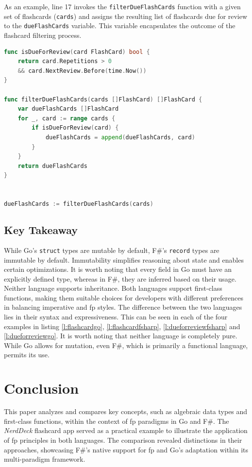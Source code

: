     As an example, line 17 invokes the \texttt{filterDueFlashCards} function with a given set of flashcards (\texttt{cards}) and assigns the resulting list of flashcards due for review to the \texttt{dueFlashCards} variable. This variable encapsulates the outcome of the flashcard filtering process.

\begin{lstlisting}[language=go, firstnumber=1, caption={FlashCard representation in F\#}, label=l:dueforreviewgo]
func isDueForReview(card FlashCard) bool {
    return card.Repetitions > 0 
    && card.NextReview.Before(time.Now())
}

func filterDueFlashCards(cards []FlashCard) []FlashCard {
    var dueFlashCards []FlashCard
    for _, card := range cards {
        if isDueForReview(card) {
            dueFlashCards = append(dueFlashCards, card)
        }
    }
    return dueFlashCards
}


dueFlashCards := filterDueFlashCards(cards)
\end{lstlisting}
            

    \section{Key Takeaway}\label{sec:keytakeaway}
    While Go's \texttt{struct} types are mutable by default, F\#'s \texttt{record} types are immutable by default. Immutability simplifies reasoning about state and enables certain optimizations. It is worth noting that every field in Go must have an explicitly defined type, whereas in F\#, they are inferred based on their usage. Neither language supports inheritance. Both languages support first-class functions, making them suitable choices for developers with different preferences in balancing imperative and \ac{fp} styles. The difference between the two languages lies in their syntax and expressiveness. This can be seen in each of the four examples in listing \ref{l:flashcardgo}, \ref{l:flashcardfsharp}, \ref{l:dueforreviewfsharp} and \ref{l:dueforreviewgo}. It is worth noting that neither language is completely pure. While Go allows for mutation, even F\#, which is primarily a functional language, permits its use.



\chapter{Conclusion}\label{chap:conclusion}
This paper analyzes and compares key concepts, such as algebraic data types and first-class functions, within the context of \ac{fp} paradigms in Go and F\#. The \textit{NerdDeck} flashcard \ac{app} served as a practical example to illustrate the application of \ac{fp} principles in both languages. The comparison revealed distinctions in their approaches, showcasing F\#'s native support for \ac{fp} and Go's adaptation within its multi-paradigm framework.

